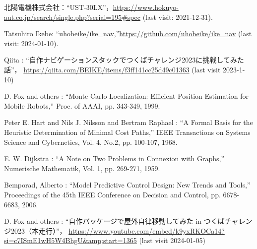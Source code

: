 \documentclass[twocolumn,9pt]{jsproceedings}
\begin{document}
\begin{thebibliography}{99}



  北陽電機株式会社：``UST-30LX''，\url{https://www.hokuyo-aut.co.jp/search/single.php?serial=195#spec} (last visit: 2021-12-31).




  Tatsuhiro Ikebe: ``uhobeike/ike\_nav,''\url{https://github.com/uhobeike/ike_nav} (last visit: 2024-01-10).

  Qiita : ``自作ナビゲーションスタックでつくばチャレンジ2023に挑戦してみた話''，
  \url{https://qiita.com/BEIKE/items/f3ff141cc25d49c01363} (last visit 2023-1-10)

  D. Fox and others : ``Monte Carlo Localization: Efficient Position Estimation for Mobile Robots,''
  Proc. of AAAI, pp. 343-349, 1999.

  Peter E. Hart and Nils J. Nilsson and Bertram Raphael : ``A Formal Basis for the Heuristic Determination of Minimal Cost Paths,''
  IEEE Transactions on Systems Science and Cybernetics, Vol. 4, No.2, pp. 100-107, 1968.

  E. W. Dijkstra : ``A Note on Two Problems in Connexion with Graphs,''
  Numerische Mathematik, Vol. 1, pp. 269-271, 1959.

  Bemporad, Alberto : ``Model Predictive Control Design: New Trends and Tools,''
  Proceedings of the 45th IEEE Conference on Decision and Control, pp. 6678-6683, 2006.

  D. Fox and others : ``自作パッケージで屋外自律移動してみた in つくばチャレンジ2023（本走行）''，
  \url{https://www.youtube.com/embed/k9yxRKOCa14?si=c7ISmE1wH5W4BhgU&amp;start=1365} (last visit 2024-01-05)
\end{thebibliography}
\normalsize
\end{document}
